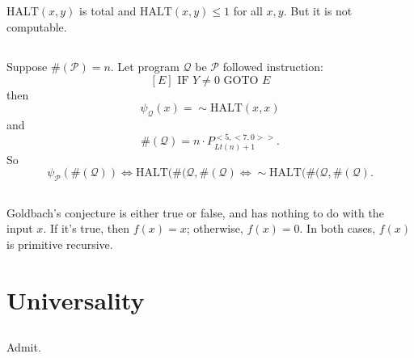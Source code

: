 \subsection{}
$ \mathrm{HALT}(x,y) $ is total and $ \mathrm{HALT}(x,y) \le 1 $ for all $ x,y $.
But it is not computable.


\subsection{}
Suppose $\#(\mathscr{P}) = n $.
Let program $\mathscr{Q}$ be $\mathscr{P}$ followed instruction:
\[ [E] \text{ IF } Y \neq 0 \text{ GOTO } E \]
then
\[ \psi_{\mathscr{Q}}(x) = \sim \mathrm{HALT}(x,x) \]
and
\[ \#(\mathscr{Q}) = n\cdot P_{Lt(n)+1}^{<5,<7,0>>} .\]
So 
\[ \psi_{\mathscr{P}}(\#(\mathscr{Q})) 
   \Leftrightarrow \mathrm{HALT}(\#(\mathscr{Q}, \#(\mathscr{Q})
   \Leftrightarrow \sim \mathrm{HALT}(\#(\mathscr{Q}, \#(\mathscr{Q}) .\]


\subsection{}
Goldbach's conjecture is either true or false, and has nothing to do with
the input $x$. If it's true, then $ f(x) = x $; otherwise, $ f(x) = 0 $.
In both cases, $f(x)$ is primitive recursive.



\section{Universality}

\subsection{}
Admit.

